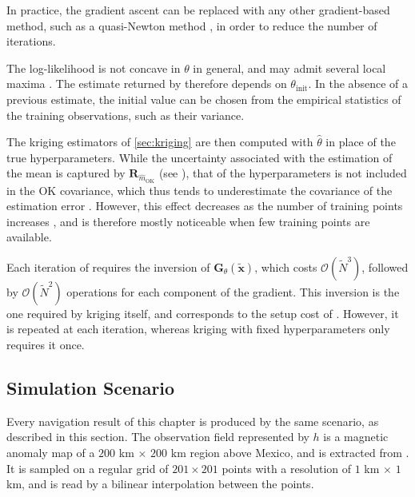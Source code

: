 In practice, the gradient ascent can be replaced with any other gradient-based method, such as a quasi-Newton method \cite{bib:quasi-Newton}, in order to reduce the number of iterations.

\begin{remark}[Initialisation]
	The log-likelihood is not concave in $\theta$ in general, and may admit several local maxima \cite{bib:evidence}. The estimate returned by  therefore depends on $\theta_{\mathrm{init}}$. In the absence of a previous estimate, the initial value can be chosen from the empirical statistics of the training observations, such as their variance.
\end{remark}

\begin{remark}
	The kriging estimators of \cref{sec:kriging} are then computed with $\hat{\theta}$ in place of the true hyperparameters. While the uncertainty associated with the estimation of the mean is captured by $\mathbf{R}_{\hat{m}_{\mathrm{OK}}}$ (see ), that of the hyperparameters is not included in the OK covariance, which thus tends to underestimate the covariance of the estimation error \cite{bib:kriging-estimated-covariance}. However, this effect decreases as the number of training points increases \cite{bib:Stein-estimated-parameters}, and is therefore mostly noticeable when few training points are available.
\end{remark}

\begin{remark}
	Each iteration of  requires the inversion of $\mathbf{G}_\theta(\tilde{\mathbf{x}})$, which costs $\mathcal{O}\left(\tilde{N}^3\right)$, followed by $\mathcal{O}\left(\tilde{N}^2\right)$ operations for each component of the gradient. This inversion is the one required by kriging itself, and corresponds to the setup cost of . However, it is repeated at each iteration, whereas kriging with fixed hyperparameters only requires it once.
\end{remark}

\subsection{Simulation Scenario}\label{sec:scenario}

Every navigation result of this chapter is produced by the same scenario, as described in this section. The observation field represented by $h$ is a magnetic anomaly map of a $200$ km $\times$ $200$ km region above Mexico, and is extracted from \cite{bib:carte-magnetique}. It is sampled on a regular grid of $201\times201$ points with a resolution of $1$ km $\times$ $1$ km, and is read by a bilinear interpolation between the points.


